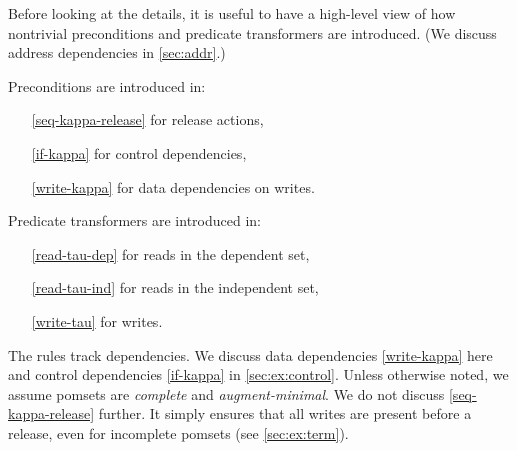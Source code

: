 Before looking at the details, it is useful to have a high-level view of how
nontrivial preconditions and predicate transformers are introduced.  (We
discuss address dependencies in \textsection\ref{sec:addr}.)
\begin{multicols}{2}
  Preconditions are introduced in: 
  \begin{itemize}
  \item[\eqref{seq-kappa-release}] for release actions,
  \item[\eqref{if-kappa}] for control dependencies, 
  \item[\eqref{write-kappa}] for data dependencies on writes.
  \end{itemize}

  Predicate transformers are introduced in:
  \begin{itemize}
  \item[\eqref{read-tau-dep}] for reads in the dependent set,
  \item[\eqref{read-tau-ind}] for reads in the independent set,
  \item[\eqref{write-tau}] for writes.
  \end{itemize}
\end{multicols}


The rules track dependencies.  We discuss data dependencies \eqref{write-kappa}
here and control dependencies \eqref{if-kappa} in
\textsection\ref{sec:ex:control}.  Unless otherwise noted, we assume pomsets
are \emph{complete} and \emph{augment-minimal}.  We do not discuss
\ref{seq-kappa-release} further.  It simply ensures that all writes are
present before a release, even for incomplete pomsets (see
\textsection\ref{sec:ex:term}).

